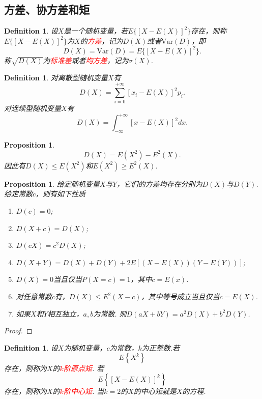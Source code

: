 \documentclass{article}
\newtheorem{proposition}[theorem]{Proposition}
\newtheorem{definition}[theorem]{Definition}
\newcommand{\redt}[1]{\textcolor{red}{#1}}
\begin{document}
\newpage
\subsection{方差、协方差和矩}

\begin{definition}
\rm 设$X$是一个随机变量，若$E\{\left[X-E(X)\right]^2\}$存在，则称$E\{\left[X-E(X)\right]^2\}$为$X$的\redt{方差}，记为$D(X)$或者$\text{Var}(D)$，即
$$
D(X) = \text{Var}(D) = E\{\left[X-E(X)\right]^2\}.
$$
称$\sqrt{D(X)}$为\redt{标准差}或者\redt{均方差}，记为$\sigma(X)$. 
\end{definition}

\begin{definition}
\rm  对离散型随机变量$X$有
$$
D(X) = \sum\limits_{i = 0}^{+\infty} \left[ x_i - E(X) \right]^2 p_i.
$$
对连续型随机变量$X$有
$$
D(X) = \int_{-\infty}^{+\infty}\left[x-E(X)\right]^2dx.
$$
\end{definition}

\begin{proposition}
\rm 
$$
D(X)= E(X^2) - E^2(X). 
$$
因此有$D(X) \leq E(X^2)$和$E(X^2) \geq E^2(X)$.
\end{proposition}


\begin{proposition}
\rm 给定随机变量$X$与$Y$，它们的方差均存在分别为$D(X)$与$D(Y)$. 给定常数$c$，则有如下性质
\begin{enumerate}
	\item $D(c) = 0$;
	\item $D(X+c) = D(X)$;
	\item $D(cX) = c^2D(X)$;
	\item $D(X+Y) = D(X)+D(Y)+2E\left[(X-E(X))(Y-E(Y))\right]$;
	\item $D(X) = 0$当且仅当$P(X=c) = 1$，其中$c=E(x)$.
	\item 对任意常数$c$有，$D(X) \leq E^2(X-c)$，其中等号成立当且仅当$c = E(X)$.
	\item 如果$X$和$Y$相互独立，$a,b$为常数. 则$D(aX+bY)=a^2D(X)+b^2D(Y)$.
\end{enumerate}
\end{proposition}

\begin{proof}
\rm 
\end{proof}


\begin{definition}
\rm 设$X$为随机变量，$c$为常数，$k$为正整数.若
$$
E \left\{ X^k \right\}
$$
存在，则称为$X$的\redt{$k$阶原点矩}. 若
$$
E \left\{ \left[X-E(X)\right]^k \right\}
$$
存在，则称为$X$的\redt{$k$阶中心矩}. 当$k=2$的$X$的中心矩就是$X$的方程. 
\end{definition}
\end{document}
